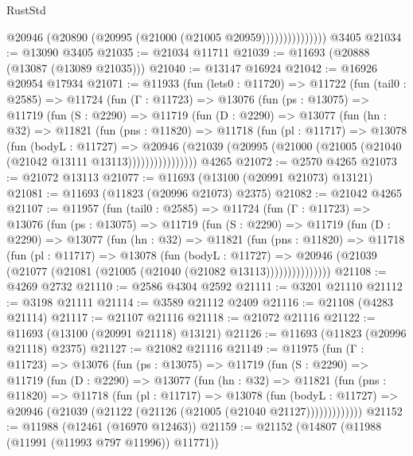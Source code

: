 \begin{lexlean}{RustStd}
\begin{coremodule}
                        @20946 (@20890 (@20995 (@21000 (@21005 @20959)))))))))))))))
    @3405
@21034 := @13090 @3405
@21035 := @21034 @11711
@21039 := @11693 (@20888 (@13087 (@13089 @21035)))
@21040 := @13147 @16924
@21042 := @16926 @20954 @17934
@21071 := @11933
    (fun (lets0 : @11720) =>
    @11722
      (fun (tail0 : @2585) =>
      @11724
        (fun (Γ : @11723) =>
        @13076
          (fun (ps : @13075) =>
          @11719
            (fun (S : @2290) =>
            @11719
              (fun (D : @2290) =>
              @13077
                (fun (hn : @32) =>
                @11821
                  (fun (pns : @11820) =>
                  @11718
                    (fun (pl : @11717) =>
                    @13078
                      (fun (bodyL : @11727) =>
                      @20946
                        (@21039
                          (@20995 (@21000 (@21005 (@21040 (@21042 @13111 @13113))))))))))))))))
    @4265
@21072 := @2570 @4265
@21073 := @21072 @13113
@21077 := @11693 (@13100 (@20991 @21073) @13121)
@21081 := @11693 (@11823 (@20996 @21073) @2375)
@21082 := @21042 @4265
@21107 := @11957
    (fun (tail0 : @2585) =>
    @11724
      (fun (Γ : @11723) =>
      @13076
        (fun (ps : @13075) =>
        @11719
          (fun (S : @2290) =>
          @11719
            (fun (D : @2290) =>
            @13077
              (fun (hn : @32) =>
              @11821
                (fun (pns : @11820) =>
                @11718
                  (fun (pl : @11717) =>
                  @13078
                    (fun (bodyL : @11727) =>
                    @20946 (@21039 (@21077 (@21081 (@21005 (@21040 (@21082 @13113)))))))))))))))
@21108 := @4269 @2732
@21110 := @2586 @4304 @2592
@21111 := @3201 @21110
@21112 := @3198 @21111
@21114 := @3589 @21112 @2409
@21116 := @21108 (@4283 @21114)
@21117 := @21107 @21116
@21118 := @21072 @21116
@21122 := @11693 (@13100 (@20991 @21118) @13121)
@21126 := @11693 (@11823 (@20996 @21118) @2375)
@21127 := @21082 @21116
@21149 := @11975
    (fun (Γ : @11723) =>
    @13076
      (fun (ps : @13075) =>
      @11719
        (fun (S : @2290) =>
        @11719
          (fun (D : @2290) =>
          @13077
            (fun (hn : @32) =>
            @11821
              (fun (pns : @11820) =>
              @11718
                (fun (pl : @11717) =>
                @13078
                  (fun (bodyL : @11727) =>
                  @20946 (@21039 (@21122 (@21126 (@21005 (@21040 @21127)))))))))))))
@21152 := @11988 (@12461 (@16970 @12463))
@21159 := @21152 (@14807 (@11988 (@11991 (@11993 @797 @11996)) @11771))

\end{coremodule}
\end{lexlean}
